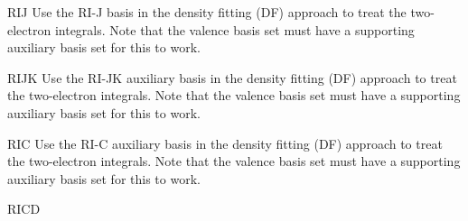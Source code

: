 \begin{keywordlist}
\item[RIJ]
Use the RI-J basis in the density fitting (DF) approach to treat the two-electron integrals. Note that the valence
basis set must have a supporting auxiliary basis set for this to work.
\item[RIJK]
Use the RI-JK auxiliary basis in the density fitting (DF) approach to treat the two-electron integrals. Note that the valence
basis set must have a supporting auxiliary basis set for this to work.
\item[RIC]
Use the RI-C auxiliary basis in the density fitting (DF) approach to treat the two-electron integrals. Note that the valence
basis set must have a supporting auxiliary basis set for this to work.
\item[RICD]

\end{keywordlist}
